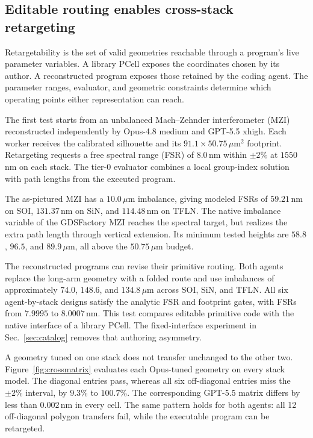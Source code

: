 \documentclass[%
 reprint,
 superscriptaddress,
 amsmath,amssymb,
 aps,
 pra,
 longbibliography,
 floatfix,
]{revtex4-2}
\begin{document}
\subsection{Editable routing enables cross-stack retargeting}
\label{sec:ladder}

Retargetability is the set of valid geometries reachable through a
program's live parameter variables. A library PCell exposes the coordinates
chosen by its author. A reconstructed program exposes those retained by the
coding agent. The parameter ranges, evaluator, and geometric constraints
determine which operating points either representation can reach.

The first test starts from an unbalanced Mach--Zehnder interferometer (MZI)
reconstructed independently by Opus-4.8 medium and GPT-5.5 xhigh. Each
worker receives the calibrated silhouette and its
$91.1\times50.75\,\mu\mathrm{m}^{2}$ footprint. Retargeting requests a
free spectral range (FSR) of $8.0$\,nm within $\pm2\%$ at $1550$\,nm on
each stack. The tier-0 evaluator combines a local group-index solution with
path lengths from the executed program.

The as-pictured MZI has a $10.0\,\mu$m imbalance, giving modeled FSRs of
$59.21$\,nm on SOI, $131.37$\,nm on SiN, and $114.48$\,nm on TFLN.
The native imbalance variable of the GDSFactory MZI reaches the spectral
target, but realizes the extra path length through vertical extension. Its
minimum tested heights are $58.8$, $96.5$, and $89.9\,\mu$m, all above the
$50.75\,\mu$m budget.

The reconstructed programs can revise their primitive routing. Both agents
replace the long-arm geometry with a folded route and use imbalances of
approximately $74.0$, $148.6$, and $134.8\,\mu$m across SOI, SiN, and
TFLN. All six agent-by-stack designs satisfy the analytic FSR and footprint
gates, with FSRs from $7.9995$ to $8.0007$\,nm. This test compares editable
primitive code with the native interface of a library PCell. The
fixed-interface experiment in Sec.~\ref{sec:catalog} removes that authoring
asymmetry.

A geometry tuned on one stack does not transfer unchanged to the other two.
Figure~\ref{fig:crossmatrix} evaluates each Opus-tuned geometry on every
stack model. The diagonal entries pass, whereas all six off-diagonal
entries miss the $\pm2\%$ interval, by $9.3\%$ to $100.7\%$. The
corresponding GPT-5.5 matrix differs by less than $0.002$\,nm in every
cell. The same pattern holds for both agents: all 12 off-diagonal polygon
transfers fail, while the executable program can be retargeted.
\end{document}
